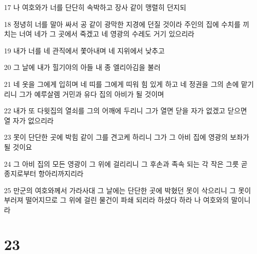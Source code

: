 \par 17 나 여호와가 너를 단단히 속박하고 장사 같이 맹렬히 던지되
\par 18 정녕히 너를 말아 싸서 공 같이 광막한 지경에 던질 것이라 주인의 집에 수치를 끼치는 너여 네가 그 곳에서 죽겠고 네 영광의 수레도 거기 있으리라
\par 19 내가 너를 네 관직에서 쫓아내며 네 지위에서 낮추고
\par 20 그 날에 내가 힐기야의 아들 내 종 엘리아김을 불러
\par 21 네 옷을 그에게 입히며 네 띠를 그에게 띠워 힘 있게 하고 네 정권을 그의 손에 맡기리니 그가 예루살렘 거민과 유다 집의 아비가 될 것이며
\par 22 내가 또 다윗집의 열쇠를 그의 어깨에 두리니 그가 열면 닫을 자가 없겠고 닫으면 열 자가 없으리라
\par 23 못이 단단한 곳에 박힘 같이 그를 견고케 하리니 그가 그 아비 집에 영광의 보좌가 될 것이요
\par 24 그 아비 집의 모든 영광이 그 위에 걸리리니 그 후손과 족속 되는 각 작은 그릇 곧 종지로부터 항아리까지리라
\par 25 만군의 여호와께서 가라사대 그 날에는 단단한 곳에 박혔던 못이 삭으리니 그 못이 부러져 떨어지므로 그 위에 걸린 물건이 파쇄 되리라 하셨다 하라 나 여호와의 말이니라

\chapter{23}


